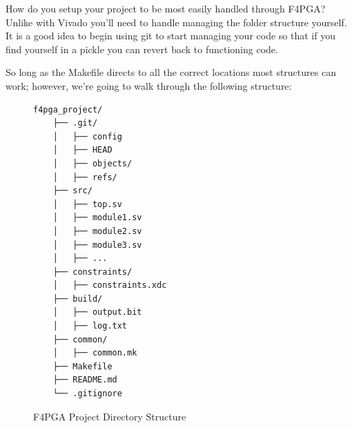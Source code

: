 How do you setup your project to be most easily handled through F4PGA? 
Unlike with Vivado you'll need to handle managing the folder structure yourself.
It is a good idea to begin using git to start managing your code so that if you find yourself in a pickle you can revert back to functioning code.

So long as the Makefile directs to all the correct locations most structures can work; 
however, we're going to walk through the following structure:

\begin{figure}[H]
    \centering
    \begin{lstlisting}[language=tree]
    f4pga_project/
    ├── .git/
    │   ├── config
    │   ├── HEAD
    │   ├── objects/
    │   ├── refs/
    ├── src/
    │   ├── top.sv
    │   ├── module1.sv
    │   ├── module2.sv
    │   ├── module3.sv
    │   ├── ...
    ├── constraints/
    │   ├── constraints.xdc
    ├── build/
    │   ├── output.bit
    │   ├── log.txt
    ├── common/
    │   ├── common.mk
    ├── Makefile
    ├── README.md
    └── .gitignore
    \end{lstlisting}
    \caption{F4PGA Project Directory Structure}
\end{figure}



